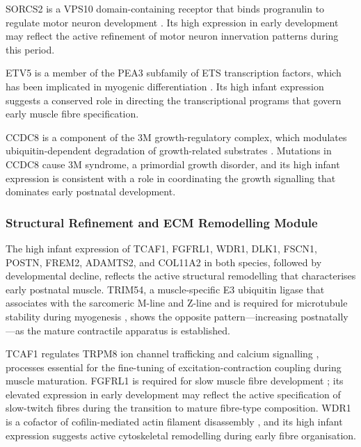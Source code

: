 SORCS2 is a VPS10 domain-containing receptor that binds progranulin to regulate motor neuron development \parencite{thomasen_sorcs2_2023}. Its high expression in early development may reflect the active refinement of motor neuron innervation patterns during this period.

ETV5 is a member of the PEA3 subfamily of ETS transcription factors, which has been implicated in myogenic differentiation \parencite{taylor_role_1997}. Its high infant expression suggests a conserved role in directing the transcriptional programs that govern early muscle fibre specification.

CCDC8 is a component of the 3M growth-regulatory complex, which modulates ubiquitin-dependent degradation of growth-related substrates \parencite{hanson_exome_2011}. Mutations in CCDC8 cause 3M syndrome, a primordial growth disorder, and its high infant expression is consistent with a role in coordinating the growth signalling that dominates early postnatal development.

\subsubsection{Structural Refinement and ECM Remodelling Module}

The high infant expression of TCAF1, FGFRL1, WDR1, DLK1, FSCN1, POSTN, FREM2, ADAMTS2, and COL11A2 in both species, followed by developmental decline, reflects the active structural remodelling that characterises early postnatal muscle. TRIM54, a muscle-specific E3 ubiquitin ligase that associates with the sarcomeric M-line and Z-line and is required for microtubule stability during myogenesis \parencite{gregorio_functional_2005}, shows the opposite pattern---increasing postnatally---as the mature contractile apparatus is established.

TCAF1 regulates TRPM8 ion channel trafficking and calcium signalling \parencite{gkika_trp_2015}, processes essential for the fine-tuning of excitation-contraction coupling during muscle maturation. FGFRL1 is required for slow muscle fibre development \parencite{amann_fgfrl1_2014}; its elevated expression in early development may reflect the active specification of slow-twitch fibres during the transition to mature fibre-type composition. WDR1 is a cofactor of cofilin-mediated actin filament disassembly \parencite{ono_functions_2018}, and its high infant expression suggests active cytoskeletal remodelling during early fibre organisation.

